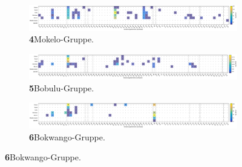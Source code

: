 \addtocounter{figure}{-1}
\begin{figure}

\begin{subfigure}{\textwidth}
	\setcounter{subfigure}{3}
	\centering
	\includegraphics[width=\textwidth]{fig/MKL_Verzierungselmente.pdf}
	\caption*{\textbf{4}\hspace{1em}Mokelo-Gruppe. \vspace{\baselineskip}}
	\label{fig:MKL_Verz}
\end{subfigure}

\begin{subfigure}{\textwidth}
	\centering
	\includegraphics[width=\textwidth]{fig/BBL_Verzierungselmente.pdf}
	\caption*{\textbf{5}\hspace{1em}Bobulu-Gruppe. \vspace{\baselineskip}}
	\label{fig:BBL_Verz}
\end{subfigure}

\begin{subfigure}{\textwidth}
	\centering
	\includegraphics[width=\textwidth]{fig/BKW_Verzierungselmente.pdf}
	\caption*{\textbf{6}\hspace{1em}Bokwango-Gruppe. \vspace{\baselineskip}}
	\label{fig:BKW_Verz}
\end{subfigure}
\end{figure}

